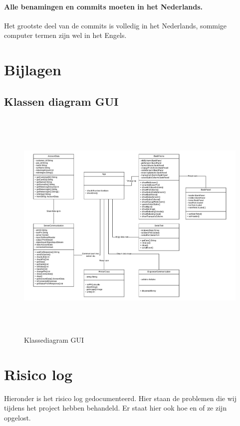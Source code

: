 \documentclass{article}
\begin{document}
\paragraph{Alle benamingen en commits moeten in het Nederlands.}
Het grootste deel van de commits is volledig in het Nederlands, sommige computer termen zijn wel in het Engels.

\newpage
\section{Bijlagen}

\subsection{Klassen diagram GUI}
\begin{figure}[H]
       \centering
       \includegraphics[height=4.5in]{Klassediagram.pdf}
       \caption{Klassediagram GUI}
       \label{fig: Klassediagram GUI}
\end{figure}

\section{Risico log}

Hieronder is het risico log gedocumenteerd.
Hier staan de problemen die wij tijdens het project hebben behandeld.
Er staat hier ook hoe en of ze zijn opgelost.

\end{document}
